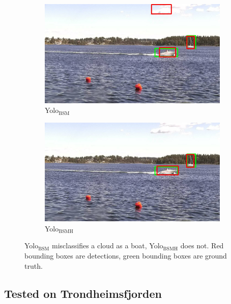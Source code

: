 \begin{figure}[h!]
\begin{subfigure}{.5\textwidth}
  \centering
  \includegraphics[width=0.9\linewidth]{results/case_buildings/yolo23/grove/yolo2/selected_06_25_frame0357.jpg}
  \caption{Yolo$_{\text{BSM}}$}
  \label{fig:misclass_yolo2}
\end{subfigure}%
\begin{subfigure}{.5\textwidth}
  \centering
  \includegraphics[width=.9\linewidth]{results/case_buildings/yolo23/grove/yolo3/selected_06_25_frame0357.jpg}
  \caption{Yolo$_{\text{BSMH}}$}
  \label{fig:misclass_yolo3}
\end{subfigure}
\caption{Yolo$_{\text{BSM}}$ misclassifies a cloud as a boat, Yolo$_{\text{BSMH}}$ does not. Red bounding boxes are detections, green bounding boxes are ground truth.}
\label{img:misclass_yolo}
\end{figure}

\newpage

\subsection{Tested on Trondheimsfjorden}
\label{sec:test_on_trf}

